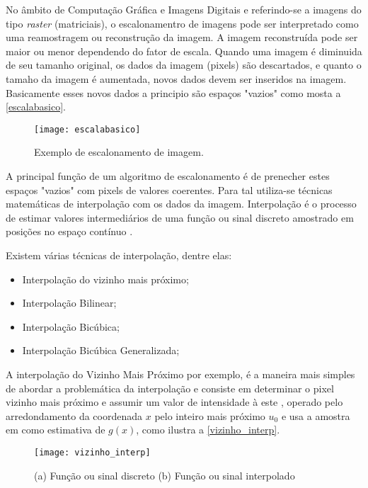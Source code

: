 No âmbito de Computação Gráfica e Imagens Digitais e referindo-se a imagens do tipo \textit{raster} (matriciais), o escalonamentro de imagens pode ser interpretado como uma reamostragem ou reconstrução da imagem. A imagem reconstruída pode ser maior ou menor dependendo do fator de escala. Quando uma imagem é diminuida de seu tamanho original, os dados da imagem (pixels) são descartados, e quanto o tamaho da imagem é aumentada, novos dados devem ser inseridos na imagem.
Basicamente esses  novos dados a principio são espaços "vazios" como mosta a \autoref{escalabasico}. 

\begin{figure}[h]
	\centering
	\texttt{[image: escalabasico]}
	\caption{Exemplo de escalonamento de imagem.}
	\label{escalabasico}
\end{figure}

A principal função de um algoritmo de escalonamento é de prenecher estes espaços "vazios" com pixels de valores coerentes. Para tal utiliza-se técnicas matemáticas de interpolação com os dados da imagem. Interpolação é o processo de estimar valores intermediários de uma função ou sinal discreto amostrado em posições no espaço contínuo \cite{luiz_vizinho}.

Existem várias técnicas de interpolação, dentre elas:

\begin{itemize}
	\item Interpolação do vizinho mais próximo;
	\item Interpolação Bilinear;
	\item Interpolação Bicúbica;
	\item Interpolação Bicúbica Generalizada;	
\end{itemize}

A interpolação do Vizinho Mais Próximo por exemplo, é a maneira mais simples de abordar a problemática da interpolação e consiste em determinar o pixel vizinho mais próximo e assumir um valor de intensidade à este \cite{giassa_escalona}, operado pelo arredondamento da coordenada $x$ pelo inteiro mais próximo $u_0$ e usa a amostra em como estimativa de $g(x)$, como ilustra a \autoref{vizinho_interp}.

\begin{figure}[h]
	\centering
	\texttt{[image: vizinho\_interp]}
	\caption{(a) Função ou sinal discreto (b) Função ou sinal interpolado }
	\label{vizinho_interp}
\end{figure}


